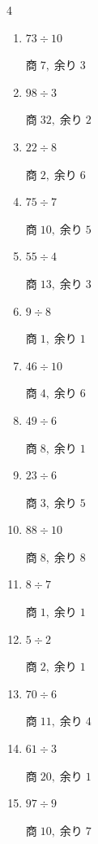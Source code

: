 \begin{multicols}{4}
\begin{enumerate}
        $商\; 48,\; 余り\; 0$

  \item $73 \div 10$

        $商\; 7,\; 余り\; 3$

  \item $98 \div 3$

        $商\; 32,\; 余り\; 2$

  \item $22 \div 8$

        $商\; 2,\; 余り\; 6$

  \item $75 \div 7$

        $商\; 10,\; 余り\; 5$

  \item $55 \div 4$

        $商\; 13,\; 余り\; 3$

  \item $9 \div 8$

        $商\; 1,\; 余り\; 1$

  \item $46 \div 10$

        $商\; 4,\; 余り\; 6$

  \item $49 \div 6$

        $商\; 8,\; 余り\; 1$

  \item $23 \div 6$

        $商\; 3,\; 余り\; 5$

  \item $88 \div 10$

        $商\; 8,\; 余り\; 8$

  \item $8 \div 7$

        $商\; 1,\; 余り\; 1$

  \item $5 \div 2$

        $商\; 2,\; 余り\; 1$

  \item $70 \div 6$

        $商\; 11,\; 余り\; 4$

  \item $61 \div 3$

        $商\; 20,\; 余り\; 1$

  \item $97 \div 9$

        $商\; 10,\; 余り\; 7$


\end{enumerate}
\end{multicols}
